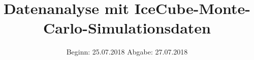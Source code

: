 

\subject{Lehrstuhlversuch E5b}
\title{Datenanalyse mit IceCube-Monte-Carlo-Simulationsdaten}
\date{
	Beginn: 25.07.2018
	\hspace{3em}
	Abgabe: 27.07.2018
}


	
	\maketitle
	\newpage
	
	
	
	
	
	
	
	\printbibliography
	


